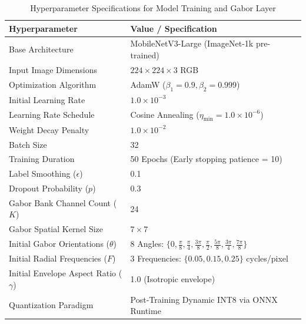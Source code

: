 \begin{table}[t]
\centering
\caption{Hyperparameter Specifications for Model Training and Gabor Layer}
\label{tab:hyperparams}
\begin{tabular}{ll}
\toprule
\textbf{Hyperparameter} & \textbf{Value / Specification} \\
\midrule
Base Architecture & MobileNetV3-Large (ImageNet-1k pre-trained) \\
Input Image Dimensions & $224 \times 224 \times 3$ RGB \\
Optimization Algorithm & AdamW ($\beta_1 = 0.9, \beta_2 = 0.999$) \\
Initial Learning Rate & $1.0 \times 10^{-3}$ \\
Learning Rate Schedule & Cosine Annealing ($\eta_{\min} = 1.0 \times 10^{-6}$) \\
Weight Decay Penalty & $1.0 \times 10^{-2}$ \\
Batch Size & 32 \\
Training Duration & 50 Epochs (Early stopping patience = 10) \\
Label Smoothing ($\epsilon$) & 0.1 \\
Dropout Probability ($p$) & 0.3 \\
Gabor Bank Channel Count ($K$) & 24 \\
Gabor Spatial Kernel Size & $7 \times 7$ \\
Initial Gabor Orientations ($\theta$) & 8 Angles: $\{0, \frac{\pi}{8}, \frac{\pi}{4}, \frac{3\pi}{8}, \frac{\pi}{2}, \frac{5\pi}{8}, \frac{3\pi}{4}, \frac{7\pi}{8}\}$ \\
Initial Radial Frequencies ($F$) & 3 Frequencies: $\{0.05, 0.15, 0.25\}$ cycles/pixel \\
Initial Envelope Aspect Ratio ($\gamma$) & 1.0 (Isotropic envelope) \\
Quantization Paradigm & Post-Training Dynamic INT8 via ONNX Runtime \\
\bottomrule
\end{tabular}
\end{table}
